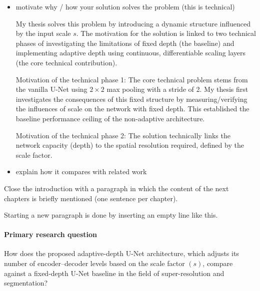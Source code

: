 \begin{itemize}
The key intuition behind my solution lies in resolving the mismatch between the fixed capacity of max pooling of traditional deep learning architectures and the variable complexity in the input. The primary intuition is that the ideal network depth should not be fixed, but should adapt most based on the input scale factor ($s$). The vanilla U-Net architecture consists of a fixed depth structure, which is suboptimal when dealing with a wide range of inputs for super-resolution. 




\item motivate why / how your solution solves the problem (this is technical)

My thesis solves this problem by introducing a dynamic structure influenced by the input scale $s$. The motivation for the solution is linked to two technical phases of investigating the limitations of fixed depth (the baseline) and implementing adaptive depth using continuous, differentiable scaling layers (the core technical contribution).

Motivation of the technical phase 1: The core technical problem stems from the vanilla U-Net using $2 \times 2$ max pooling with a stride of 2. My thesis first investigates the consequences of this fixed structure by measuring/verifying the influences of scale on the network with fixed depth. This established the baseline performance ceiling of the non-adaptive architecture. 

Motivation of the technical phase 2: The solution technically links the network capacity (depth) to the spatial resolution required, defined by the scale factor. 

\item explain how it compares with related work

\end{itemize}

Close the introduction with a paragraph in which the content of the next chapters
is briefly mentioned (one sentence per chapter). 

Starting a new paragraph is done by inserting an empty line like this.


\paragraph{Primary research question}

How does the proposed adaptive-depth U-Net architecture, which adjusts its number of encoder–decoder levels based on the scale factor $(s)$, compare against a fixed-depth U-Net baseline in the field of super-resolution and segmentation? 

